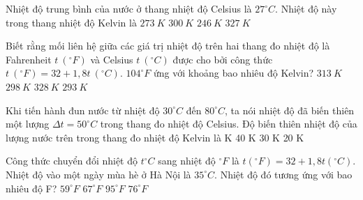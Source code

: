 


\begin{ex}
	Nhiệt độ trung bình của nước ở thang nhiệt độ Celsius là $27^\circ C$. Nhiệt độ này trong thang nhiệt độ Kelvin là
	\choice
	{$273\ K$}
	{\True $300\ K$}
	{$246\ K$}
	{$327\ K$}
	\end{ex}


\begin{ex}
	Biết rằng mối liên hệ giữa các giá trị nhiệt độ trên hai thang đo nhiệt độ là Fahrenheit $t\ (^\circ F)$ và Celsius $t\ (^\circ C)$ được cho bởi công thức $t\ (^\circ F)=32+1,8t\ (^\circ C)$. $104^\circ F$ ứng với khoảng bao nhiêu độ Kelvin?
	\choice
	{\True $313\ K$}
	{$298\ K$}
	{$328\ K$}
	{$293\ K$}
	\end{ex}








\begin{ex} 
	Khi tiến hành đun nước từ nhiệt độ $30^\circ C$ đến $80^\circ C$, ta nói nhiệt độ đã biến thiên một lượng $\Delta t=50^\circ C$ trong thang đo nhiệt độ Celsius. Độ biến thiên nhiệt độ của lượng nước trên trong thang đo nhiệt độ Kelvin là
	\choice
	{ K}
	{40 K}
	{30 K}
	{20 K}
\end{ex}

\begin{ex}
	Công thức chuyển đổi nhiệt độ $t^\circ C$ sang nhiệt độ $^\circ F$ là $t\left(^\circ F\right)=32+1,8 t\left(^\circ C\right)$. Nhiệt độ vào một ngày mùa hè ở Hà Nội là $35^\circ C$. Nhiệt độ đó tương ứng với bao nhiêu độ F?
	\choice
	{$59^\circ F$}
	{$67^\circ F$}
	{\True $95^\circ F$}
	{$76^\circ F$}
	\end{ex}

